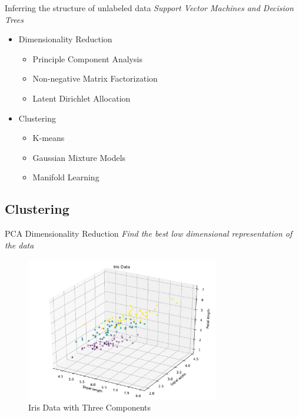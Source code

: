 \documentclass[10pt]{beamer}
\begin{document}
\begin{frame}{Inferring the structure of unlabeled data}
\emph{Support Vector Machines and Decision Trees}
	\begin{itemize}
		\item Dimensionality Reduction
		\begin{itemize}
			\item Principle Component Analysis
			\item Non-negative Matrix Factorization
			\item Latent Dirichlet Allocation
		\end{itemize}
		\item Clustering
		\begin{itemize}
			\item K-means
			\item Gaussian Mixture Models
			\item Manifold Learning
		\end{itemize}
	\end{itemize}
\end{frame}

\subsection{Clustering}

\begin{frame}{PCA Dimensionality Reduction}
\emph{Find the best low dimensional representation of the data}
		\begin{figure}
			\caption{Iris Data with Three Components}
			\includegraphics[width=0.75\textwidth, center, trim=0cm 0cm 0 0cm]{images/Iris_Data_3comp.pdf}
	\end{figure}
\end{frame}
\end{document}
